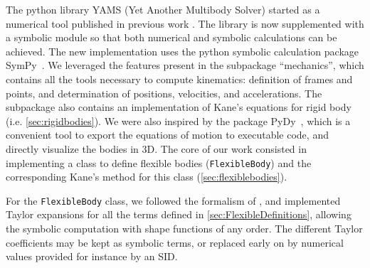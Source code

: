 \documentclass[wes, manuscript]{copernicus}
\begin{document}
The python library YAMS (Yet Another Multibody Solver) started as a numerical tool published in previous work \citep{branlard:2019flex}.
The library is now supplemented with a symbolic module so that both numerical and symbolic calculations can be achieved.
The new implementation uses the python symbolic calculation package SymPy~\citep{sympy}. We leveraged the features present in the subpackage ``mechanics'', which contains all the tools necessary to compute kinematics: definition of frames and points, and determination of positions, velocities, and accelerations. The subpackage also contains an implementation of Kane's equations for rigid body (i.e. \autoref{sec:rigidbodies}). We were also inspired by the package PyDy~\citep{Gede:2013}, which is a convenient tool to export the equations of motion to executable code, and directly visualize the bodies in 3D. The core of our work consisted in implementing a class to define flexible bodies (\texttt{FlexibleBody}) and the corresponding Kane's method for this class (\autoref{sec:flexiblebodies}).  

For the \texttt{FlexibleBody} class, we followed the formalism of \cite{Wallrapp:1994}, and implemented Taylor expansions for all the terms defined in \autoref{sec:FlexibleDefinitions}, allowing the symbolic computation with shape functions of any order. 
The different Taylor coefficients may be kept as symbolic terms, or replaced early on by numerical values provided for instance by an SID. 
\end{document}
